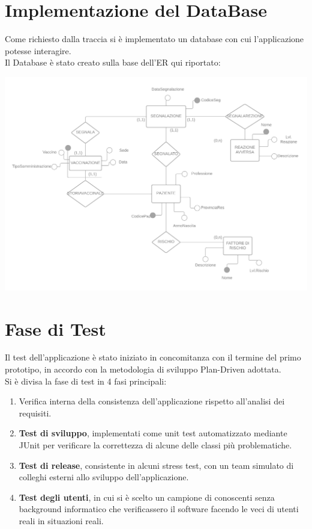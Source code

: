 \documentclass{article}
\begin{document}
\newpage
    \section{Implementazione del DataBase}
    Come richiesto dalla traccia si è implementato un database con cui l'applicazione potesse interagire.\\
    Il Database è stato creato sulla base dell'ER qui riportato:
        \begin{center}
            \includegraphics[width=1\textwidth]{pictures/_Diagramma vuoto.png}
        \end{center}

\newpage
    \section{Fase di Test}
    Il test dell'applicazione è stato iniziato in concomitanza con il termine del primo prototipo, in accordo con la metodologia di sviluppo Plan-Driven adottata.\\
    Si è divisa la fase di test in 4 fasi principali:
    \begin{enumerate}
        \item Verifica interna della consistenza dell'applicazione rispetto all'analisi dei requisiti.
        \item \textbf{Test di sviluppo}, implementati come unit test automatizzato mediante JUnit per verificare la correttezza di
        alcune delle classi più problematiche.
        \item \textbf{Test di release}, consistente in alcuni stress test, con un team simulato di colleghi esterni allo sviluppo dell'applicazione.
        \item \textbf{Test degli utenti}, in cui si è scelto un campione di conoscenti senza background informatico che verificassero il software facendo le veci di utenti reali in situazioni reali.
    \end{enumerate}
\end{document}
